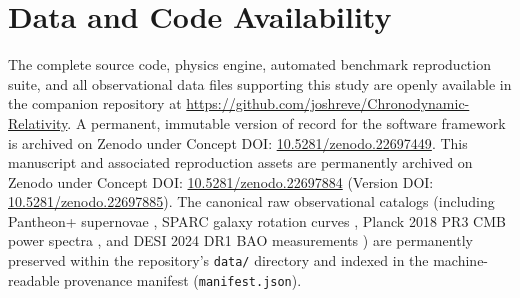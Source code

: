 \documentclass[aps,prd,reprint,superscriptaddress,nofootinbib,floatfix,amsmath,amssymb]{revtex4-2}
\begin{document}
\section*{Data and Code Availability}
The complete source code, physics engine, automated benchmark reproduction suite, and all observational data files supporting this study are openly available in the companion repository \cite{shreve_chronodynamic_2026} at \url{https://github.com/joshreve/Chronodynamic-Relativity}. A permanent, immutable version of record for the software framework is archived on Zenodo under Concept DOI: \href{https://doi.org/10.5281/zenodo.22697449}{10.5281/zenodo.22697449}. This manuscript and associated reproduction assets are permanently archived on Zenodo under Concept DOI: \href{https://doi.org/10.5281/zenodo.22697884}{10.5281/zenodo.22697884} (Version DOI: \href{https://doi.org/10.5281/zenodo.22697885}{10.5281/zenodo.22697885}). The canonical raw observational catalogs (including Pantheon+ supernovae \cite{PantheonPlus2022}, SPARC galaxy rotation curves \cite{SPARC2016}, Planck 2018 PR3 CMB power spectra \cite{Planck2018_Cosmology}, and DESI 2024 DR1 BAO measurements \cite{DESI2024_BAO}) are permanently preserved within the repository's \texttt{data/} directory and indexed in the machine-readable provenance manifest (\texttt{manifest.json}).


\end{document}
